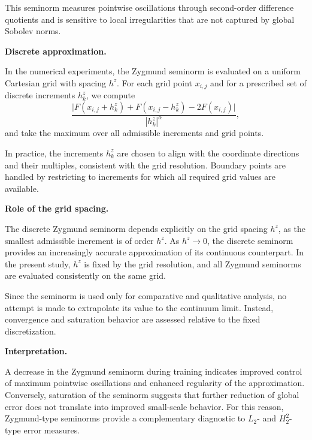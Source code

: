 \documentclass[11pt,reqno]{amsart}
\numberwithin{equation}{section}
\theoremstyle{remark}
\theoremstyle{definition}
\newcommand{\emphTitle}[1]{\medskip\noindent\textbf{#1.}\quad}
\def \L {L_2}
\def \H {H^2_2}
\begin{document}
This seminorm measures pointwise oscillations through second-order difference quotients and is sensitive to local irregularities that are not captured by global Sobolev norms.

\emphTitle{Discrete approximation}

In the numerical experiments, the Zygmund seminorm is evaluated on a uniform Cartesian grid with spacing $h^z$.
For each grid point $x_{i,j}$ and for a prescribed set of discrete increments $h^z_k$, we compute
\[
\frac{
\bigl|F(x_{i,j}+h^z_k)+F(x_{i,j}-h^z_k)-2F(x_{i,j})\bigr|
}{
|h^z_k|^{\alpha}
},
\]
and take the maximum over all admissible increments and grid points.

In practice, the increments $h^z_k$ are chosen to align with the coordinate directions and their multiples, consistent with the grid resolution.
Boundary points are handled by restricting to increments for which all required grid values are available.

\emphTitle{Role of the grid spacing}

The discrete Zygmund seminorm depends explicitly on the grid spacing $h^z$, as the smallest admissible increment is of order $h^z$.
As $h^z\to 0$, the discrete seminorm provides an increasingly accurate approximation of its continuous counterpart.
In the present study, $h^z$ is fixed by the grid resolution, and all Zygmund seminorms are evaluated consistently on the same grid.

Since the seminorm is used only for comparative and qualitative analysis, no attempt is made to extrapolate its value to the continuum limit.
Instead, convergence and saturation behavior are assessed relative to the fixed discretization.

\emphTitle{Interpretation}

A decrease in the Zygmund seminorm during training indicates improved control of maximum pointwise oscillations and enhanced regularity of the approximation.
Conversely, saturation of the seminorm suggests that further reduction of global error does not translate into improved small-scale behavior.
For this reason, Zygmund-type seminorms provide a complementary diagnostic to $\L$- and $\H$-type error measures.






% 
\end{document}
